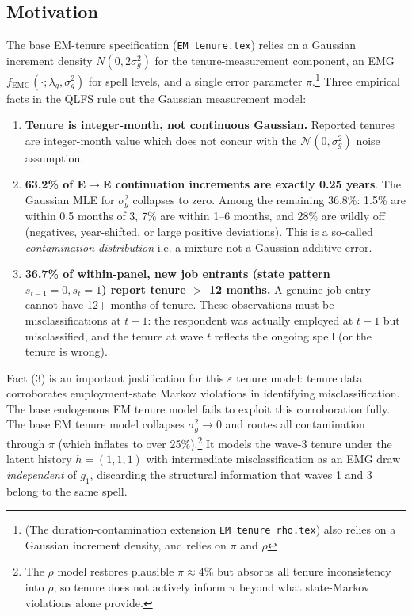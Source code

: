 

\subsection{Motivation}

The base EM-tenure specification (\texttt{EM tenure.tex}) relies on a
Gaussian increment density \(N(0, 2\sigma_g^2)\) for the tenure-measurement
component, an EMG \(f_{\mathrm{EMG}}(\cdot;\lambda_g,\sigma_g^2)\) for spell
levels, and a single error parameter \(\pi\).\footnote{(The
duration-contamination extension \texttt{EM tenure rho.tex}) also relies on a Gaussian increment density, and relies on $\pi$ and $\rho$ } Three empirical facts in the QLFS rule out the Gaussian
measurement model:

\begin{enumerate}
\item \textbf{Tenure is integer-month, not continuous Gaussian.} 
  Reported tenures are integer-month value which does not concur with the
  \(\mathcal{N}(0,\sigma_g^2)\) noise assumption.
\item \textbf{63.2\% of E\(\to\)E continuation increments are exactly 0.25
  years}. The Gaussian MLE for \(\sigma_g^2\)
  collapses to zero. Among the remaining 36.8\%: 1.5\% are within 0.5 months
  of 3, 7\% are within 1--6 months, and 28\% are wildly off (negatives,
  year-shifted, or large positive deviations). This is a so-called \textit{contamination
  distribution} \textemdash i.e. a mixture \textemdash not a Gaussian additive error.
\item \textbf{36.7\% of within-panel, new job entrants (state pattern
  \(s_{t-1}=0,s_t=1\)) report tenure \(>\) 12 months.} A genuine job entry
  cannot have 12+ months of tenure. These observations must be
  misclassifications at \(t-1\): the respondent was actually employed at
  \(t-1\) but misclassified, and the tenure at wave \(t\) reflects the
  ongoing spell (or the tenure is wrong).
\end{enumerate}

Fact (3) is an important justification for this \(\varepsilon\) tenure model: tenure
data corroborates employment-state Markov violations in identifying misclassification.
The base endogenous EM tenure model fails to exploit this corroboration
fully. The base EM tenure model collapses \(\sigma_g^2 \to 0\) and routes all
contamination through \(\pi\) (which inflates to over 25\%).\footnote{The \(\rho\) model
restores plausible \(\pi \approx 4\%\) but absorbs all tenure inconsistency
into \(\rho\), so tenure does not actively inform \(\pi\) beyond what
state-Markov violations alone provide.} It models the wave-3 tenure under
the latent history \(h=(1,1,1)\) with intermediate misclassification as an
EMG draw \emph{independent} of \(g_1\), discarding the structural information
that waves 1 and 3 belong to the same spell. 

